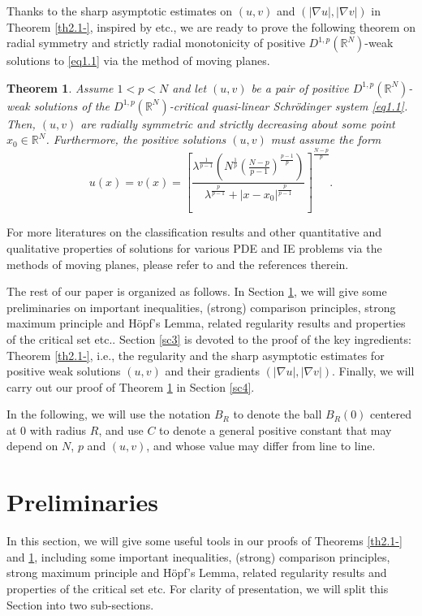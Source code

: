 \documentclass[12pt]{amsart}
\newtheorem{thm}{Theorem}[section]
\theoremstyle{definition}
\theoremstyle{remark}
\theoremstyle{conclusion}
\theoremstyle{conjecture}
\numberwithin{equation}{section}
\newcommand{\R}{\mathbb{R}}
\begin{document}
\medskip

Thanks to the sharp asymptotic estimates on $(u,v)$ and $(|\nabla u|,|\nabla v|)$ in Theorem \ref{th2.1-}, inspired by \cite{DLL,LDSMLMSB,BS16,VJ16} etc., we are ready to prove the following theorem on radial symmetry and strictly radial monotonicity of positive $D^{1,p}(\mathbb{R}^{N})$-weak solutions to \eqref{eq1.1} via the method of moving planes.
\begin{thm}\label{th2}
Assume $1<p<N$ and let $ (u,v)$ be a pair of positive $D^{1,p}(\mathbb{R}^{N})$-weak solutions of the $D^{1,p}(\mathbb{R}^{N})$-critical quasi-linear Schr\"{o}dinger system \eqref{eq1.1}. Then, $(u,v)$ are radially symmetric and strictly decreasing about some point $x_0\in\R^N$. Furthermore, the positive solutions $(u,v)$ must assume the form
\[u(x)=v(x)=\left[ \frac{\lambda^{\frac{1}{p-1}}\left(N^{\frac{1}{p}}\left(\frac{N-p}{p-1}\right)^{\frac{p-1}{p}}\right)}{\lambda^{\frac{p}{p-1}}+|x-x_0|^{\frac{p}{p-1}}} \right]^{\frac{N-p}{p}}.\]
\end{thm}

\smallskip

For more literatures on the classification results and other quantitative and qualitative properties of solutions for various PDE and IE problems via the methods of moving planes, please refer to \cite{CGS,CL,CL1,CLL,CLO,CDQ,DLS,DQ,LD,DP,LDSMLMSB,DLPFRM,LDMR,LDBS04,GNN,LPLDHT,Lin,BS16,S,VJ16,WX} and the references therein.

\smallskip

The rest of our paper is organized as follows. In Section \ref{sc2}, we will give some preliminaries on important inequalities, (strong) comparison principles, strong maximum principle and H\"{o}pf's Lemma, related regularity results and properties of the critical set etc.. Section \ref{sc3} is devoted to the proof of the key ingredients: Theorem \ref{th2.1-}, i.e., the regularity and the sharp asymptotic estimates for positive weak solutions $(u,v)$ and their gradients $(|\nabla u|,|\nabla v|)$. Finally, we will carry out our proof of Theorem \ref{th2} in Section \ref{sc4}.

\smallskip

In the following, we will use the notation $B_{R}$ to denote the ball $B_{R}(0)$ centered at $0$ with radius $R$, and use $C$ to denote a general positive constant that may depend on $N$, $p$ and $(u,v)$, and whose value may differ from line to line.




\section{Preliminaries}\label{sc2}
In this section, we will give some useful tools in our proofs of Theorems  \ref{th2.1-} and \ref{th2}, including some important inequalities, (strong) comparison principles, strong maximum principle and H\"{o}pf's Lemma, related regularity results and properties of the critical set etc. For clarity of presentation, we will split this Section into two sub-sections.
\end{document}

